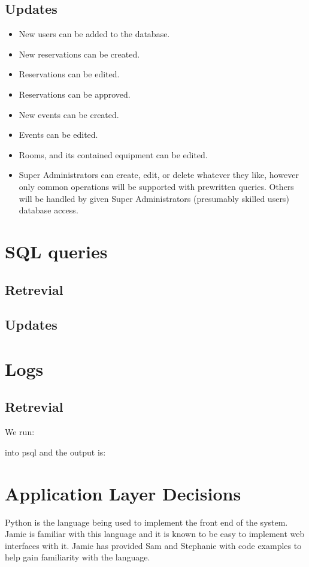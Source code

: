 \documentclass{article}
\begin{document}
\subsection{Updates}
\begin{itemize}
\item New users can be added to the database.
\item New reservations can be created.
\item Reservations can be edited.
\item Reservations can be approved.
\item New events can be created.
\item Events can be edited.
\item Rooms, and its contained equipment can be edited.
\item Super Administrators can create, edit, or delete whatever they like,
however only common operations will be supported with prewritten queries.
Others will be handled by given Super Administrators (presumably skilled users) database access.
\end{itemize}

\section{SQL queries}
\subsection{Retrevial}


\subsection{Updates}


\section{Logs}
\subsection{Retrevial}
We run:
 
into psql and the output is:


\section{Application Layer Decisions}
Python is the language being used to implement the front end of the system. Jamie is familiar with this language
and it is known to be easy to implement web interfaces with it. Jamie has provided Sam and Stephanie with code examples
to help gain familiarity with the language.
\end{document}
